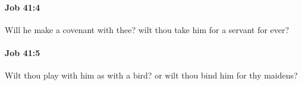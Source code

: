 		\paragraph{Job 41:4} %
			\label{JOB-41-4}

			Will he make a covenant with thee? wilt thou take him for a servant for ever?


		\paragraph{Job 41:5} %
			\label{JOB-41-5}

			Wilt thou play with him as with a bird? or wilt thou bind him for thy maidens?


